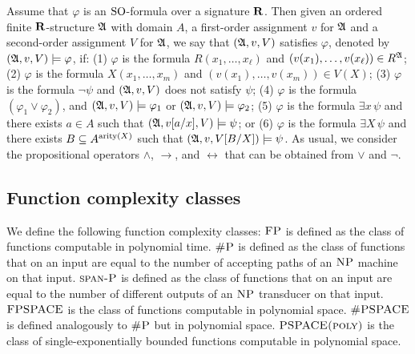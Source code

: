 Assume that $\varphi$ is an ${\rm SO}$-formula over a signature $\mathbf{R}$. Then given an ordered finite $\mathbf{R}$-structure $\mathfrak{A}$ with domain $A$, a first-order assignment $v$ for $\mathfrak{A}$ and a second-order assignment $V$ for $\mathfrak{A}$, we say that $(\mathfrak{A}, v, V)$ satisfies $\varphi$, denoted by $(\mathfrak{A}, v, V) \models \varphi$, if: (1) $\varphi$ is the formula $R(x_1, \ldots, x_\ell)$ and $(v(x_1), \ldots, v(x_\ell)) \in R^{\mathfrak{A}}$; (2) $\varphi$ is the formula $X(x_1, \ldots, x_m)$ and $(v(x_1), \ldots, v(x_m)) \in V(X)$; (3) $\varphi$ is the formula $\neg \psi$ and $(\mathfrak{A}, v, V)$ does not satisfy $\psi$; (4) $\varphi$ is the formula $(\varphi_1 \vee \varphi_2)$, and $(\mathfrak{A}, v, V) \models \varphi_1$ or $(\mathfrak{A}, v, V) \models \varphi_2$; (5) $\varphi$ is the formula $\exists x \, \psi$ and there exists $a \in A$ such that $(\mathfrak{A}, v[a/x], V) \models \psi$; or (6) $\varphi$ is the formula $\exists X \, \psi$ and there exists $B \subseteq A^{{\rm arity}(X)}$ such that $(\mathfrak{A}, v, V[B/X]) \models \psi$.  As usual, we consider the propositional operators $\wedge$, $\rightarrow$, and $\leftrightarrow$ that can be obtained from $\vee$ and $\neg$. 





\subsection{Function complexity classes}


We define the following function complexity classes: $\text{\sc FP}$ is defined as the class of functions computable in polynomial time. $\text{\sc \#P}$ is defined as the class of functions that on an input are equal to the number of accepting paths of an $\text{\sc NP}$ machine on that input. $\text{\sc span-P}$ is defined as the class of functions that on an input are equal to the number of different outputs of an $\text{\sc NP}$ transducer on that input. $\text{\sc FPSPACE}$ is the class of functions computable in polynomial space. $\text{\sc \#PSPACE}$ is defined analogously to $\text{\sc \#P}$ but in polynomial space. $\text{\sc PSPACE(poly)}$ is the class of single-exponentially bounded functions computable in polynomial space. 

